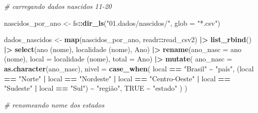 \documentclass[
]{article}
\newenvironment{Shaded}{\begin{snugshade}}{\end{snugshade}}
\newcommand{\AttributeTok}[1]{\textcolor[rgb]{0.13,0.29,0.53}{#1}}
\newcommand{\CommentTok}[1]{\textcolor[rgb]{0.56,0.35,0.01}{\textit{#1}}}
\newcommand{\ConstantTok}[1]{\textcolor[rgb]{0.56,0.35,0.01}{#1}}
\newcommand{\FunctionTok}[1]{\textcolor[rgb]{0.13,0.29,0.53}{\textbf{#1}}}
\newcommand{\NormalTok}[1]{#1}
\newcommand{\OtherTok}[1]{\textcolor[rgb]{0.56,0.35,0.01}{#1}}
\newcommand{\SpecialCharTok}[1]{\textcolor[rgb]{0.81,0.36,0.00}{\textbf{#1}}}
\newcommand{\StringTok}[1]{\textcolor[rgb]{0.31,0.60,0.02}{#1}}
\begin{document}
\begin{Shaded}
\begin{Highlighting}[]
\CommentTok{\# carregando dados nascidos 11{-}20}

\NormalTok{nascidos\_por\_ano }\OtherTok{\textless{}{-}}\NormalTok{ fs}\SpecialCharTok{::}\FunctionTok{dir\_ls}\NormalTok{(}\StringTok{"01.dados/nascidos/"}\NormalTok{, }\AttributeTok{glob =} \StringTok{"*.csv"}\NormalTok{)}

\NormalTok{dados\_nascidos }\OtherTok{\textless{}{-}} \FunctionTok{map}\NormalTok{(nascidos\_por\_ano, readr}\SpecialCharTok{::}\NormalTok{read\_csv2) }\SpecialCharTok{|\textgreater{}} 
  \FunctionTok{list\_rbind}\NormalTok{() }\SpecialCharTok{|\textgreater{}} 
  \FunctionTok{select}\NormalTok{(}\StringTok{\textasciigrave{}}\AttributeTok{ano (nome)}\StringTok{\textasciigrave{}}\NormalTok{, }\StringTok{\textasciigrave{}}\AttributeTok{localidade (nome)}\StringTok{\textasciigrave{}}\NormalTok{, Ano) }\SpecialCharTok{|\textgreater{}} 
  \FunctionTok{rename}\NormalTok{(}\AttributeTok{ano\_nasc =} \StringTok{\textasciigrave{}}\AttributeTok{ano (nome)}\StringTok{\textasciigrave{}}\NormalTok{, }\AttributeTok{local =} \StringTok{\textasciigrave{}}\AttributeTok{localidade (nome)}\StringTok{\textasciigrave{}}\NormalTok{, }\AttributeTok{total =}\NormalTok{ Ano) }\SpecialCharTok{|\textgreater{}} 
  \FunctionTok{mutate}\NormalTok{(}
    \AttributeTok{ano\_nasc =} \FunctionTok{as.character}\NormalTok{(ano\_nasc),}
    \AttributeTok{nivel =} \FunctionTok{case\_when}\NormalTok{(}
\NormalTok{      local }\SpecialCharTok{==} \StringTok{"Brasil"} \SpecialCharTok{\textasciitilde{}} \StringTok{"país"}\NormalTok{,}
\NormalTok{      (local }\SpecialCharTok{==} \StringTok{"Norte"} \SpecialCharTok{|}\NormalTok{ local }\SpecialCharTok{==} \StringTok{"Nordeste"} \SpecialCharTok{|}\NormalTok{ local }\SpecialCharTok{==} \StringTok{"Centro{-}Oeste"} \SpecialCharTok{|}
\NormalTok{         local }\SpecialCharTok{==} \StringTok{"Sudeste"} \SpecialCharTok{|}\NormalTok{ local }\SpecialCharTok{==} \StringTok{"Sul"}\NormalTok{) }\SpecialCharTok{\textasciitilde{}} \StringTok{"região"}\NormalTok{,}
      \ConstantTok{TRUE} \SpecialCharTok{\textasciitilde{}} \StringTok{"estado"}
\NormalTok{    )}
\NormalTok{  )}

\CommentTok{\# renomeando nome dos estados}


\end{Highlighting}
\end{Shaded}
\end{document}
